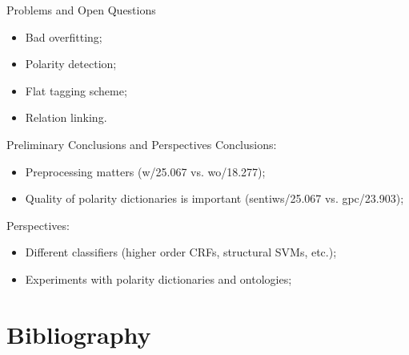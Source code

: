 \documentclass{beamer}
\begin{document}
    \begin{frame}{Problems and Open Questions}
      \begin{itemize}
        \item Bad overfitting;
        \item Polarity detection;
        \item Flat tagging scheme;
        \item Relation linking.
      \end{itemize}
    \end{frame}

    \begin{frame}{Preliminary Conclusions and Perspectives}
      Conclusions:
      \begin{itemize}
        \item Preprocessing matters (w/25.067 vs. wo/18.277);
        \item Quality of polarity dictionaries is important (sentiws/25.067 vs. gpc/23.903);
      \end{itemize}

      Perspectives:
      \begin{itemize}
        \item Different classifiers (higher order CRFs, structural SVMs, etc.);
        \item Experiments with polarity dictionaries and ontologies;
      \end{itemize}
    \end{frame}

    \section*{Bibliography}
    
    
    
\end{document}
